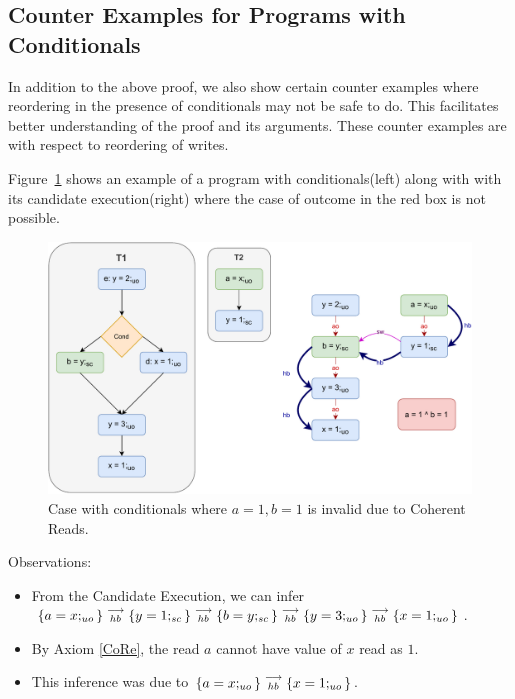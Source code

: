 \subsection{Counter Examples for Programs with Conditionals}
    
    In addition to the above proof, we also show certain counter examples where reordering in the presence of conditionals may not be safe to do. 
    This facilitates better understanding of the proof and its arguments. 
    These counter examples are with respect to reordering of writes. 
    
    Figure~\ref{reord:cond_counter_example1(a)} shows an example of a program with conditionals(left) along with with its candidate execution(right) where the case of outcome in the red box is not possible. 
    \begin{figure}[H]
        \centering 
        \includegraphics[scale=0.7]{4.InstructionReordering/5.ValidReorderingProgram/CounterExamples1a(Conditionals).pdf}
        \caption{Case with conditionals where $a = 1, b = 1$ is invalid due to Coherent Reads.}
        \label{reord:cond_counter_example1(a)}
    \end{figure}
    
    Observations:
    \begin{itemize}
        \item From the Candidate Execution, we can infer $\{a=x;_{uo}\}\stackrel{\longrightarrow}{_{hb}}\{y=1;_{sc}\}\stackrel{\longrightarrow}{_{hb}}\{b=y;_{sc}\}\stackrel{\longrightarrow}{_{hb}}\{y=3;_{uo}\}\stackrel{\longrightarrow}{_{hb}}\{x=1;_{uo}\}$.
        \item By Axiom \ref{CoRe}, the read $a$ cannot have value of $x$ read as $1$. 
        \item This inference was due to $\{a=x;_{uo}\}\stackrel{\longrightarrow}{_{hb}}\{x=1;_{uo}\}$.
    \end{itemize}
    
